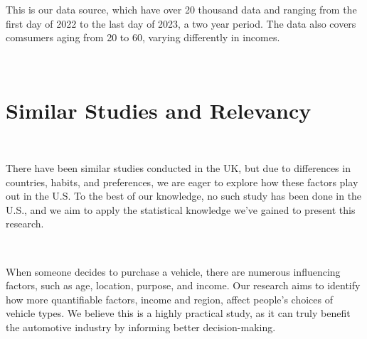 \documentclass{article}
\begin{document}
This is our data source, which have over 20 thousand data and ranging from the first day of 2022 to the last day of 2023, a two year period. The data also covers comsumers aging from 20 to 60, varying differently in incomes.

~

\section{Similar Studies and Relevancy}

~

There have been similar studies conducted in the UK\cite{PIERCE2023363}, but due to differences in countries, habits, and preferences, we are eager to explore how these factors play out in the U.S. To the best of our knowledge, no such study has been done in the U.S., and we aim to apply the statistical knowledge we've gained to present this research.

~

When someone decides to purchase a vehicle, there are numerous influencing factors, such as age, location, purpose, and income.  Our research aims to identify how more quantifiable factors, income and region, affect people's choices of vehicle types.  We believe this is a highly practical study, as it can truly benefit the automotive industry by informing better decision-making.


\newpage


\end{document}
